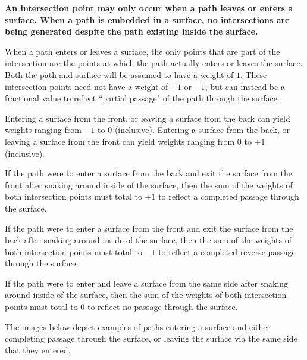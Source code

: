 {\bf An intersection point may only occur when a path leaves or enters a surface. When a path is embedded in a surface, no intersections are being generated despite the path existing inside the surface.}

When a path enters or leaves a surface, the only points that are part of the intersection are the points at which the path actually enters or leaves the surface. Both the path and surface will be assumed to have a weight of \(1\). These intersection points need not have a weight of \(+1\) or \(-1\), but can instead be a fractional value to reflect ``partial passage" of the path through the surface. 

Entering a surface from the front, or leaving a surface from the back can yield weights ranging from \(-1\) to \(0\) (inclusive). Entering a surface from the back, or leaving a surface from the front can yield weights ranging from \(0\) to \(+1\) (inclusive). 

If the path were to enter a surface from the back and exit the surface from the front after snaking around inside of the surface, then the sum of the weights of both intersection points must total to \(+1\) to reflect a completed passage through the surface.

If the path were to enter a surface from the front and exit the surface from the back after snaking around inside of the surface, then the sum of the weights of both intersection points must total to \(-1\) to reflect a completed reverse passage through the surface.

If the path were to enter and leave a surface from the same side after snaking around inside of the surface, then the sum of the weights of both intersection points must total to \(0\) to reflect no passage through the surface.

The images below depict examples of paths entering a surface and either completing passage through the surface, or leaving the surface via the same side that they entered. 


